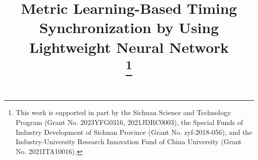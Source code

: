 \documentclass[conference]{IEEEtran}
\begin{document}
\title{Metric Learning-Based Timing Synchronization by Using Lightweight Neural Network\\
\thanks{This work is supported in part by the Sichuan Science and Technology Program (Grant No. 2023YFG0316, 2021JDRC0003), the Special Funds of Industry Development of Sichuan Province (Grant No. zyf-2018-056), and the Industry-University Research Innovation Fund of China University (Grant No. 2021ITA10016).}
}

\author{
}
\end{document}
